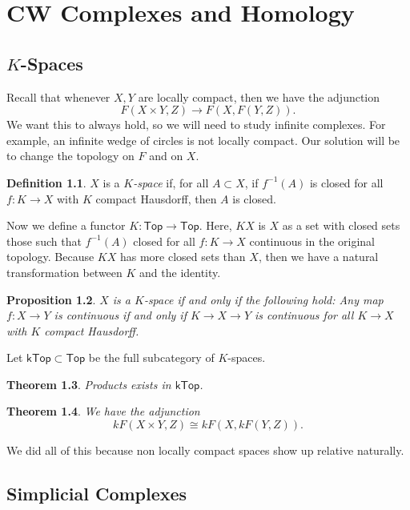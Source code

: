 \documentclass[leqno, openany]{memoir}
\newtheorem{thm}{Theorem}[section]
\newtheorem{prop}[thm]{Proposition}
\theoremstyle{definition}
\newtheorem{defn}[thm]{Definition}
\theoremstyle{remark}
\theoremstyle{plain}
\theoremstyle{definition}
\theoremstyle{remark}
\newcommand{\ms}[1]{\mathsf{#1}}
\begin{document}
\chapter{CW Complexes and Homology}%
\label{cha:changing_spaces}

\section{$K$-Spaces}%
\label{sec:_k_spaces}

Recall that whenever $X,Y$ are locally compact, then we have the adjunction
\[ F(X \times Y, Z) \to F(X, F(Y, Z)). \]
We want this to always hold, so we will need to study infinite complexes. For example, an infinite wedge of circles is not locally compact. Our solution will be to change the topology on $F$ and on $X$.

\begin{defn}
    $X$ is a \textit{$K$-space} if, for all $A \subset X$, if $f^{-1}(A)$ is closed for all $f \colon K \to X$ with $K$ compact Hausdorff, then $A$ is closed.
\end{defn}

Now we define a functor $K \colon \ms{Top} \to \ms{Top}$. Here, $KX$ is $X$ as a set with closed sets those such that $f^{-1}(A)$ closed for all $f \colon K \to X$ continuous in the original topology. Because $KX$ has more closed sets than $X$, then we have a natural transformation between $K$ and the identity.

\begin{prop}
    $X$ is a $K$-space if and only if the following hold: Any map $f \colon X \to Y$ is continuous if and only if $K \to X \to Y$ is continuous for all $K \to X$ with $K$ compact Hausdorff.
\end{prop}

Let $\ms{kTop} \subset \ms{Top}$ be the full subcategory of $K$-spaces.

\begin{thm}
    Products exists in $\ms{kTop}$.
\end{thm}

\begin{thm}
    We have the adjunction
    \[ kF(X \times Y, Z) \cong kF(X, kF(Y, Z)). \]
\end{thm}

We did all of this because non locally compact spaces show up relative naturally. 

\section{Simplicial Complexes}%
\label{sec:simplicial_complexes}
\end{document}
